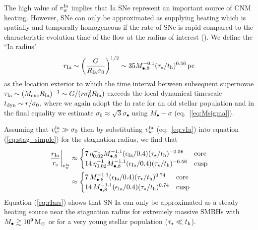 \documentclass[usenatbib,fleqn]{mn2e}
\begin{document}
The high value of $v_{w}^{\rm Ia}$ implies that Ia SNe represent an
important source of CNM heating.  However, SNe can only be
approximated as supplying heating which is spatially and temporally
homogeneous if the rate of SNe is rapid compared to the characteristic
evolution time of the flow at the radius of interest
(\citealt{ShcherbakovWong+:2014a}).  We define the ``Ia radius"
  \begin{align}
    r_{\rm Ia} \sim \left(\frac{G}{R_{\rm Ia}\sigma_0}\right)^{1/2} \sim
    35 M_{\bullet,8}^{-0.1}(\tau_{\star}/t_{\rm h})^{0.56}\,{\rm pc}
    \label{eq:rIa}
  \end{align}
  as the location exterior to which the time interval between
  subsequent supernovae $\tau_{\rm Ia} \sim (M_{\rm enc}R_{\rm
    Ia})^{-1} \sim G/(r\sigma_0^{2}R_{\rm Ia})$ exceeds the local
  dynamical timescale $t_{\rm dyn} \sim r/\sigma_0$, where we again
  adopt the Ia rate for an old stellar population and in the final
  equality we estimate $\sigma_0 \approx \sqrt{3}\sigma_{\bullet}$
  using $M_{\bullet}-\sigma$ (eq.~[\ref{eq:Msigma}]).

Assuming that $v_{w}^{\rm Ia} \gg \sigma_0$ then by substituting
$v_{w}^{\rm Ia}$ (eq.~\ref{eq:vIa}) into equation (\ref{eq:stag_simple})
for the stagnation radius, we find that
\begin{align}
  \left.\frac{r_{\rm Ia}}{r_{\rm s}}\right|_{\rm v_{w}^{\rm Ia}}&\approx
  \begin{cases}
    7\, \eta_{0.02}^{-1} M_{\bullet,8}^{-1.1}(\epsilon_{\rm
     Ia}/0.4) (\tau_{\star}/t_{\rm h})^{-0.56}  & {\rm core}\\
    14\, \eta_{0.02}^{-1} M_{\bullet,8}^{-1.1}(\epsilon_{\rm
     Ia}/0.4) (\tau_{\star}/t_{\rm h})^{-0.56} &{\rm cusp}\\
   \end{cases} \nonumber\\
 &\approx 
 \begin{cases}
    7\, M_{\bullet,8}^{-1.1}(\epsilon_{\rm
     Ia}/0.4) (\tau_{\star}/t_{\rm h})^{0.74}  & {\rm core}\\
    14\, M_{\bullet,8}^{-1.1}(\epsilon_{\rm
     Ia}/0.4) (\tau_{\star}/t_{\rm h})^{0.74} &{\rm cusp}\\
   \end{cases}
\label{eq:rIars}
\end{align}
Equation (\ref{eq:rIars}) shows that SN Ia can only be approximated as
a steady heating source near the stagnation radius for extremely
massive SMBHs with $M_{\bullet} \gtrsim 10^9 \,{\rm M_\odot}$ or for a very
young stellar population ($\tau_{\star} \ll t_{\rm h}$).
\end{document}
